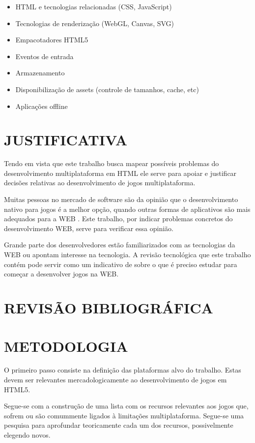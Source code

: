 \documentclass[
12pt,
a4paper,
portuges,
draft
]{report}
\begin{document}
\begin{itemize}
\item HTML e tecnologias relacionadas (CSS, JavaScript)
\item Tecnologias de renderização (WebGL, Canvas, SVG)
\item Empacotadores HTML5
\item Eventos de entrada
\item Armazenamento
\item Disponibilização de assets (controle de tamanhos, cache, etc)
\item Aplicações offline
\end{itemize}

\chapter{JUSTIFICATIVA}

Tendo em vista que este trabalho busca mapear possíveis problemas
do desenvolvimento multiplataforma em HTML ele serve para apoiar
e justificar decisões relativas ao desenvolvimento de jogos
multiplataforma.

Muitas pessoas no mercado de software são da opinião que o
desenvolvimento nativo para jogos é a melhor opção, quando outras formas de aplicativos são mais adequados para a WEB \cite[pp. 21]{aSeriousContender}. Este trabalho, por indicar problemas concretos do desenvolvimento
WEB, serve para verificar essa opinião.

Grande parte dos desenvolvedores estão familiarizados com as
tecnologias da WEB ou apontam interesse na tecnologia. A revisão
tecnológica que este trabalho contém pode servir como um indicativo
de sobre o que é preciso estudar para começar a desenvolver jogos na
WEB.


\chapter{REVISÃO BIBLIOGRÁFICA}

\chapter{METODOLOGIA}
\thispagestyle{myheadings}

O primeiro passo consiste na definição das plataformas alvo do trabalho.
Estas devem ser relevantes mercadologicamente ao desenvolvimento de
jogos em HTML5.

Segue-se com a construção de uma lista com os recursos relevantes
aos jogos que, sofrem ou são comummente ligados à
limitações multiplataforma. Segue-se uma pesquisa para aprofundar
teoricamente cada um dos recursos, possivelmente elegendo novos.
\end{document}
